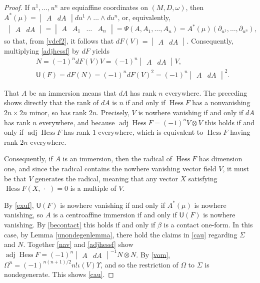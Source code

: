 \documentclass [leqno, 10pt]{amsart}
\theoremstyle{definition}
\numberwithin{equation}{section}
\newcommand{\Om}{\Omega}
\newcommand{\imt}{\iota}
\newcommand{\U}{\mathsf{U}}
\newcommand{\om}{\omega}
\newcommand{\hess}{\operatorname{Hess}}
\newcommand{\adj}{\operatorname{adj}}
\newcommand{\dum}{\,\cdot\,\,}
\newcommand{\pr}{\partial}
\newcommand{\be}{\beta}
\newcommand{\tensor}{\otimes}
\begin{document}
\begin{proof}
If $u^{1}, \dots, u^{n}$ are equiaffine coordinates on $(M, D, \om)$, then $A^{\ast}(\mu) = \begin{vmatrix} A & dA \end{vmatrix}du^{1} \wedge \dots \wedge du^{n}$, or, equivalently,
\begin{align}
\begin{vmatrix} A & dA \end{vmatrix}= \begin{vmatrix} A & A_{1} & \dots & A_{n} \end{vmatrix} = \Psi(A, A_{1}, \dots, A_{n}) =  A^{\ast}(\mu)(\pr_{u^{1}}, \dots, \pr_{u^{n}}),
\end{align}
so that, from \eqref{vdef2}, it follows that $dF(V) = \begin{vmatrix} A & dA \end{vmatrix}$. Consequently, multiplying \eqref{adjhessf} by $dF$ yields
\begin{align}
\label{nav}
&N = (-1)^{n}dF(V)V = (-1)^{n}\begin{vmatrix} A & dA \end{vmatrix}V,\\
\label{exuf}
&\U(F) = dF(N) = (-1)^{n}dF(V)^{2} = (-1)^{n}\begin{vmatrix} A & dA \end{vmatrix}^{2}.
\end{align}

That $A$ be an immersion means that $dA$ has rank $n$ everywhere. The preceding shows directly that the rank of $dA$ is $n$ if and only if $\hess F$ has a nonvanishing $2n \times 2n$ minor, so has rank $2n$. Precisely, $V$ is nowhere vanishing if and only if $dA$ has rank $n$ everywhere, and because $\adj \hess F = (-1)^{n}V \tensor V$ this holds if and only if $\adj \hess F$ has rank $1$ everywhere, which is equivalent to $\hess F$ having rank $2n$ everywhere.

Consequently, if $A$ is an immersion, then the radical of $\hess F$ has dimension one, and since the radical contains the nowhere vanishing vector field $V$, it must be that $V$ generates the radical, meaning that any vector $X$ satisfying $\hess F(X, \dum) = 0$ is a multiple of $V$.

By \eqref{exuf}, $\U(F)$ is nowhere vanishing if and only if $A^{\ast}(\mu)$ is nowhere vanishing, so $A$ is a centroaffine immersion if and only if $\U(F)$ is nowhere vanishing. By \eqref{becontact} this holds if and only if $\be$ is a contact one-form. In this case, by Lemma \ref{unondegenlemma}, there hold the claims in \eqref{cau} regarding $\Sigma$ and $N$. Together \eqref{nav} and \eqref{adjhessf} show $\adj \hess F = (-1)^{n}\begin{vmatrix} A & dA \end{vmatrix}^{-1}N \tensor N$. By \eqref{vom}, $\Om^{n} = (-1)^{n(n+1)/2}n!\imt(V)\Upsilon$, and so the restriction of $\Om$ to $\Sigma$ is nondegenerate. This shows \eqref{cau}.


\end{proof}
\end{document}
